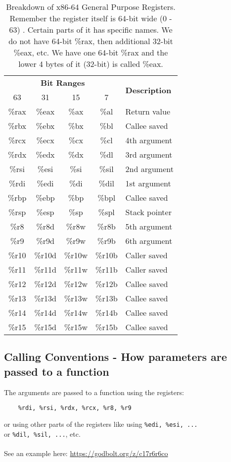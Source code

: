 \documentclass{article}
\begin{document}
\begin{table}[h]
    \centering
    \begin{tabular}{|c|c|c|c|l|}
        \hline
        \multicolumn{4}{|c|}{\textbf{Bit Ranges}} & \multirow{2}{*}{\textbf{Description}} \\
        \cline{1-4}
        63 & 31 & 15 & 7 &  \\
        \hline
        \%rax  & \%eax  & \%ax  & \%al  & Return value \\
        \%rbx  & \%ebx  & \%bx  & \%bl  & Callee saved \\
        \%rcx  & \%ecx  & \%cx  & \%cl  & 4th argument \\
        \%rdx  & \%edx  & \%dx  & \%dl  & 3rd argument \\
        \%rsi  & \%esi  & \%si  & \%sil & 2nd argument \\
        \%rdi  & \%edi  & \%di  & \%dil & 1st argument \\
        \%rbp  & \%ebp  & \%bp  & \%bpl & Callee saved \\
        \%rsp  & \%esp  & \%sp  & \%spl & Stack pointer \\
        \%r8   & \%r8d  & \%r8w  & \%r8b  & 5th argument \\
        \%r9   & \%r9d  & \%r9w  & \%r9b  & 6th argument \\
        \%r10  & \%r10d & \%r10w & \%r10b & Caller saved \\
        \%r11  & \%r11d & \%r11w & \%r11b & Caller saved \\
        \%r12  & \%r12d & \%r12w & \%r12b & Callee saved \\
        \%r13  & \%r13d & \%r13w & \%r13b & Callee saved \\
        \%r14  & \%r14d & \%r14w & \%r14b & Callee saved \\
        \%r15  & \%r15d & \%r15w & \%r15b & Callee saved \\
        \hline
    \end{tabular}
    \caption{Breakdown of x86-64 General Purpose Registers. Remember the register itself is 64-bit wide (0 - 63) . Certain parts of it has specific names. We do not have 64-bit \%rax, then additional 32-bit \%eax, etc. We have one 64-bit \%rax and the lower 4 bytes of it (32-bit) is called \%eax.}
    \label{tab:x86_64_registers}
\end{table}
\clearpage
\subsection{Calling Conventions - How parameters are passed to a function}
\label{sec: how-args-passed}
The arguments are passed to a function using the registers:
\begin{verbatim}
    %rdi, %rsi, %rdx, %rcx, %r8, %r9
\end{verbatim}
or using other parts of the registers like using \texttt{\%edi, \%esi, ...} \\
or \texttt{\%dil, \%sil, ...}, etc. \\
\\
See an example here: \url{https://godbolt.org/z/c17r6r6co} \\
\end{document}
